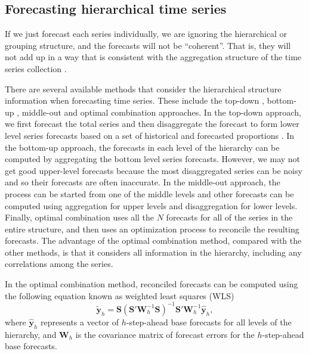 \documentclass[11pt,a4paper,]{article}
\begin{document}
\hypertarget{forecasting-hierarchical-time-series}{%
\subsection{Forecasting hierarchical time series}\label{forecasting-hierarchical-time-series}}

If we just forecast each series individually, we are ignoring the hierarchical or grouping structure, and the forecasts will not be ``coherent''. That is, they will not add up in a way that is consistent with the aggregation structure of the time series collection \autocite{fpp2}.

There are several available methods that consider the hierarchical structure information when forecasting time series. These include the top-down \autocite{gross1990disaggregation,fliedner2001hierarchical}, bottom-up \autocite{kahn1998revisiting}, middle-out and optimal combination \autocite{hyndman2011optimal} approaches. In the top-down approach, we first forecast the total series and then disaggregate the forecast to form lower level series forecasts based on a set of historical and forecasted proportions \autocite[for details see][]{athanasopoulos2009hierarchical}. In the bottom-up approach, the forecasts in each level of the hierarchy can be computed by aggregating the bottom level series forecasts. However, we may not get good upper-level forecasts because the most disaggregated series can be noisy and so their forecasts are often inaccurate. In the middle-out approach, the process can be started from one of the middle levels and other forecasts can be computed using aggregation for upper levels and disaggregation for lower levels. Finally, optimal combination uses all the \(N\) forecasts for all of the series in the entire structure, and then uses an optimization process to reconcile the resulting forecasts. The advantage of the optimal combination method, compared with the other methods, is that it considers all information in the hierarchy, including any correlations among the series.

In the optimal combination method, reconciled forecasts can be computed using the following equation known as weighted least squares (WLS) \autocite{mint2018}
\begin{equation}\label{eq:mint}
  \tilde{\bm{y}}_{h}=\bm{S}(\bm{S}'\bm{W}_h^{-1}\bm{S})^{-1}\bm{S}'\bm{W}_h^{-1}\hat{\bm{y}}_h,
\end{equation}
where \(\hat{\bm{y}}_h\) represents a vector of \(h\)-step-ahead base forecasts for all levels of the hierarchy, and \(\bm{W}_h\) is the covariance matrix of forecast errors for the \(h\)-step-ahead base forecasts.
\end{document}
